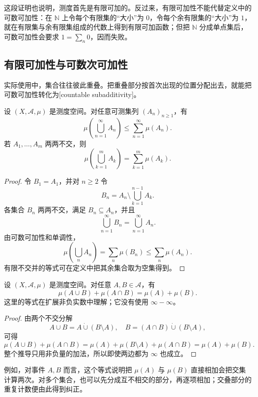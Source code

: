 这段证明也说明，测度首先是有限可加的。反过来，有限可加性不能代替定义中的可数可加性：在 \(\mathbb N\) 上令每个有限集的“大小”为 \(0\)，令每个余有限集的“大小”为 \(1\)，就在有限集与余有限集组成的代数上得到有限可加函数；但把 \(\mathbb N\) 分成单点集后，可数可加性会要求 \(1=\sum_n0\)，因而失败。

\subsection{有限可加性与可数次可加性}
\label{b1:subsec:020102}

实际使用中，集合往往彼此重叠。把重叠部分按首次出现的位置分配出去，就能把可数可加性转化为[countable subadditivity]。

\begin{proposition}
\label{b1:prop:measure-subadditivity}
设 \((X,\mathcal A,\mu)\) 是测度空间。对任意可测集列 \((A_n)_{n\geq1}\)，有
\[
\mu\left(\bigcup_{n=1}^{\infty}A_n\right)
\leq\sum_{n=1}^{\infty}\mu(A_n).
\]
若 \(A_1,\ldots,A_m\) 两两不交，则
\[
\mu\left(\bigcup_{k=1}^{m}A_k\right)=\sum_{k=1}^{m}\mu(A_k).
\]
\end{proposition}
\begin{proof}
令 \(B_1=A_1\)，并对 \(n\geq2\) 令
\[
B_n=A_n\setminus\bigcup_{k=1}^{n-1}A_k.
\]
各集合 \(B_n\) 两两不交，满足 \(B_n\subseteq A_n\)，并且
\[
\bigcup_{n=1}^{\infty}B_n=\bigcup_{n=1}^{\infty}A_n.
\]
由可数可加性和单调性，
\[
\mu\left(\bigcup_nA_n\right)
=\sum_n\mu(B_n)
\leq\sum_n\mu(A_n).
\]
有限不交并的等式可在定义中把其余集合取为空集得到。
\end{proof}

\begin{proposition}
\label{b1:prop:measure-inclusion-exclusion}
设 \((X,\mathcal A,\mu)\) 是测度空间。对任意 \(A,B\in\mathcal A\)，有
\[
\mu(A\cup B)+\mu(A\cap B)=\mu(A)+\mu(B).
\]
这里的等式在扩展非负实数中理解；它没有使用 \(\infty-\infty\)。
\end{proposition}
\begin{proof}
由两个不交分解
\[
A\cup B=A\mathbin{\dot\cup}(B\setminus A),
\quad
B=(A\cap B)\mathbin{\dot\cup}(B\setminus A),
\]
可得
\[
\mu(A\cup B)+\mu(A\cap B)
=\mu(A)+\mu(B\setminus A)+\mu(A\cap B)
=\mu(A)+\mu(B).
\]
整个推导只用非负量的加法，所以即使两边都为 \(\infty\) 也成立。
\end{proof}

例如，对事件 \(A,B\) 而言，这个等式说明把 \(\mu(A)\) 与 \(\mu(B)\) 直接相加会把交集计算两次。对多个集合，也可以先分成互不相交的部分，再逐项相加；交叠部分的重复计数便由此得到纠正。

